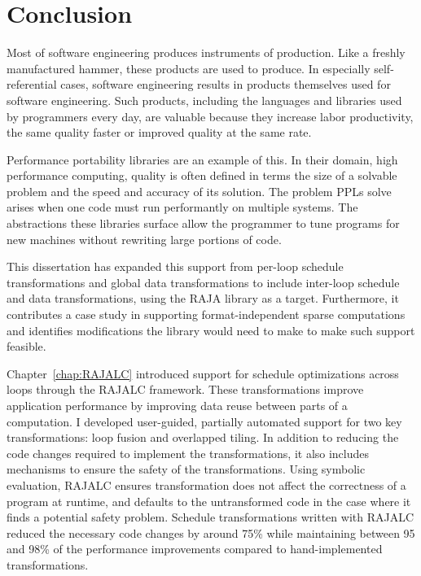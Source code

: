 \chapter{Conclusion}\label{chap:Conclusion}

Most of software engineering produces instruments of production.
Like a freshly manufactured hammer, these products are used to produce.
In especially self-referential cases, software engineering results in products themselves used for software engineering.
Such products, including the languages and libraries used by programmers every day, are valuable because they increase labor productivity, the same quality faster or improved quality at the same rate.

Performance portability libraries are an example of this.
In their domain, high performance computing, quality is often defined in terms the size of a solvable problem and the speed and accuracy of its solution.
The problem PPLs solve arises when one code must run performantly on multiple systems. 
The abstractions these libraries surface allow the programmer to tune programs for new machines without rewriting large portions of code.

This dissertation has expanded this support from per-loop schedule transformations and global data transformations to include inter-loop schedule and data transformations, using the RAJA library as a target.
Furthermore, it contributes a case study in supporting format-independent sparse computations and identifies modifications the library would need to make to make such support feasible.

Chapter~\ref{chap:RAJALC} introduced support for schedule optimizations across loops through the RAJALC framework.
These transformations improve application performance by improving data reuse between parts of a computation.
I developed user-guided, partially automated support for two key transformations: loop fusion and overlapped tiling.
In addition to reducing the code changes required to implement the transformations, it also includes mechanisms to ensure the safety of the transformations.
Using symbolic evaluation, RAJALC ensures transformation does not affect the correctness of a program at runtime, and defaults to the untransformed code in the case where it finds a potential safety problem.
Schedule transformations written with RAJALC reduced the necessary code changes by around 75\% while maintaining between 95 and 98\% of the performance improvements compared to hand-implemented transformations.

